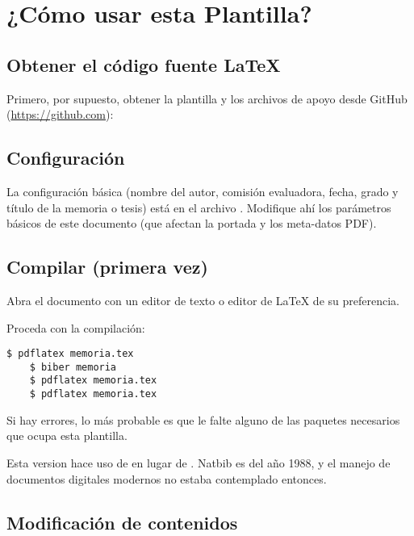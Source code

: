 
\chapter{¿Cómo usar esta Plantilla?}

\section{Obtener el código fuente \LaTeX}

Primero, por supuesto, obtener la plantilla y los archivos de apoyo desde GitHub (\url{https://github.com}):



\section{Configuración}

La configuración básica (nombre del autor, comisión evaluadora, fecha, grado y título de la memoria o tesis) está en el archivo . Modifique ahí los parámetros básicos de este documento (que afectan la portada y los meta-datos PDF).

\section{Compilar (primera vez)}

Abra el documento  con un editor de texto o editor de \LaTeX{} de su preferencia.

Proceda con la compilación:

\begin{Verbatim}[frame=lines, label=Consola (Shell) o Línea de comandos
, fontsize=\footnotesize
, baselinestretch=1
, formatcom=\color{gray}]
    $ pdflatex memoria.tex
    $ biber memoria
    $ pdflatex memoria.tex
    $ pdflatex memoria.tex
\end{Verbatim}

Si hay errores, lo más probable es que le falte alguno de las paquetes necesarios que ocupa esta plantilla.

Esta version hace uso de  en lugar de . Natbib es del año 1988, y el manejo de documentos digitales modernos no estaba contemplado entonces.

\section{Modificación de contenidos}


